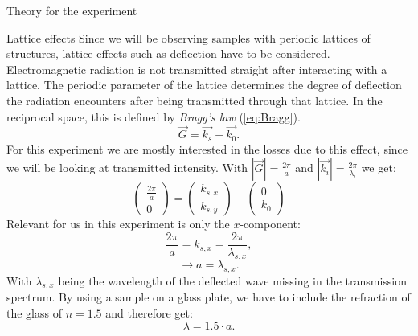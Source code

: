 \documentclass[pdftex, a4paper,11pt, twoside, UKenglish]{report}
\begin{document}
\begin{chapter}{Theory for the experiment}
    \begin{section}{Lattice effects}
      \label{chp:TheoryLatticeeffects}
      Since we will be observing samples with periodic lattices of structures,
      lattice effects such as deflection have to be considered. Electromagnetic
      radiation is not transmitted straight after interacting with a lattice.
      The periodic parameter of the lattice determines the degree of deflection
      the radiation encounters after being transmitted through that lattice.
      In the reciprocal space, this is defined by \textit{Bragg's law}
      (\cref{eq:Bragg}).
      \begin{equation}
        \label{eq:Bragg}
        \vec{G}=\vec{k_{s}}-\vec{k_{0}}.
      \end{equation}
      For this experiment we are mostly interested in the losses due to this
      effect, since we will be looking at transmitted intensity.
      With $|\vec{G}|=\frac{2\pi}{a}$ and
      $|\vec{k_{i}}|=\frac{2\pi}{\lambda_{i}}$ we get:
      \begin{equation}
        \begin{pmatrix} \frac{2\pi}{a} \\ 0 \end{pmatrix} =
        \begin{pmatrix} k_{s,x} \\ k_{s, y} \end{pmatrix} -
        \begin{pmatrix} 0 \\ k_{0} \end{pmatrix}
      \end{equation}
      Relevant for us in this experiment is only the $x$-component:
      \begin{equation}
        \frac{2\pi}{a} = k_{s, x} = \frac{2\pi}{\lambda_{s, x}},
      \end{equation}
      \begin{equation}
        \rightarrow a = \lambda_{s, x}.
      \end{equation}
      With $\lambda_{s, x}$ being the wavelength of the deflected wave missing
      in the transmission spectrum. By using a sample on a glass plate, we have
      to include the refraction of the glass of $n=1.5$ and therefore get:
      \begin{equation}
        \lambda = 1.5 \cdot a.
      \end{equation}
    \end{section}
    

\end{chapter}
\end{document}
